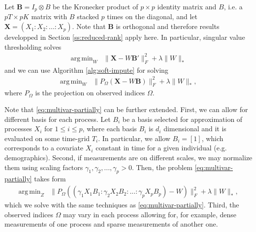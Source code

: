 \documentclass[preprint]{imsart}
\numberwithin{equation}{section}
\theoremstyle{plain}
\newcommand{\bX}{\mathbf{X}}
\newcommand{\bB}{\mathbf{B}}
\DeclareMathOperator*{\argmin}{arg\,min}
\DeclareMathOperator*{\diag}{diag}
\begin{document}

Let $ \bB = I_p \otimes B $ be the Kronecker product of $p \times p$ identity matrix and $B$, i.e. a $pT \times pK$ matrix with $B$ stacked $p$ times on the diagonal, and let $\bX = (X_{1}: X_{2}:...: X_{p})$. Note that $\bB$ is orthogonal and therefore results developped in Section \ref{ss:reduced-rank} apply here. In particular, singular value thresholding solves
\begin{align*}%
\argmin_{W} &\| \bX - W \bB' \|_F^2 + \lambda\|W\|_*
\end{align*}
and we can use Algorithm \ref{alg:soft-impute} for solving
\begin{align}\label{eq:multivar-partially}
\argmin_{W} &\| P_{\Omega}\left(\bX - W\bB\right) \|_F^2 + \lambda\|W\|_*,
\end{align}
where $P_{\Omega}$ is the projection on observed indices $\Omega$.

Note that \eqref{eq:multivar-partially} can be further extended. First, we can allow for different basis for each process. Let $B_{i}$ be a basis selected for approximation of processes $X_{i}$ for $1 \leq i \leq p$, where each basis $B_i$ is $d_i$ dimensional and it is evaluated on some time-grid $T_i$. In particular, we allow $B_i = [1]$, which corresponds to a covariate $X_i$ constant in time for a given individual (e.g. demographics). Second, if measurements are on different scales, we may normalize them using scaling factors $\gamma_1, \gamma_2,..., \gamma_p > 0$. Then, the problem \eqref{eq:multivar-partially} takes form
\begin{align*}
\argmin_{Z} &\| P_{\Omega}\left((\gamma_1 X_{1}B_1:\gamma_2 X_{2}B_2:...:\gamma_p X_{p}B_p) - W\right) \|_F^2 + \lambda\|W\|_*,
\end{align*}
which we solve with the same techniques as \eqref{eq:multivar-partially}. Third, the observed indices $\Omega$ may vary in each process allowing for, for example, dense measurements of one process and sparse measurements of another one. 

\end{document}
